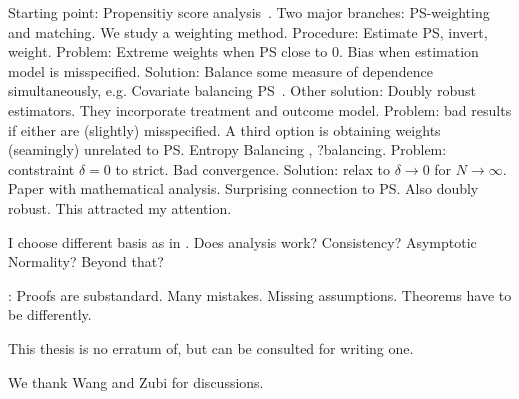 Starting point:
Propensitiy score analysis~\cite{Rosenbaum1983}.
Two major branches: PS-weighting and matching.
We study a weighting method.
Procedure: Estimate PS, invert, weight.
Problem: Extreme weights when PS close to 0.
Bias when estimation model is misspecified.
Solution: Balance some measure of dependence simultaneously, e.g.
Covariate balancing PS~\cite{Imai2014a}.
Other solution: Doubly robust estimators\cite{H2005}.
They incorporate treatment and outcome model.
Problem: bad results if either are (slightly) misspecified\cite{Kang2007}.
A third option is obtaining weights (seamingly) unrelated to PS.
Entropy Balancing \cite{Hainmueller2012}, ?balancing\cite{Zubizarreta2015}.
Problem: contstraint $\delta=0$ to strict. Bad convergence.
Solution: relax to $\delta\to 0$ for $N\to\infty$.
Paper with mathematical analysis\cite{Wang2019}. Surprising connection
to PS. Also doubly robust\cite{Zhao2017a}.
This attracted my attention. 

I choose different basis as in \cite{Gyorfi2002}. Does analysis work?
Consistency? Asymptotic Normality? Beyond that?

\cite{Wang2019}: Proofs are substandard. Many mistakes. Missing assumptions. Theorems have to be differently.

This thesis is no erratum of\cite{Wang2019}, but can be consulted for writing one.

We thank Wang and Zubi for discussions.
